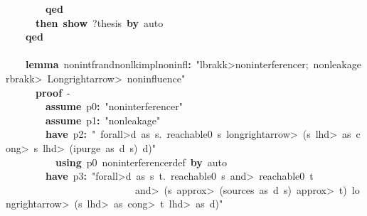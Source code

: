 \documentclass{article}
\newcommand{\syntaxKEYWORDA}[1]{\textcolor[rgb]{0.0,0.4,0.6}{\textbf{#1}}}
\newcommand{\syntaxKEYWORDC}[1]{\textcolor[rgb]{0.0,0.6,1.0}{\textbf{#1}}}
\newcommand{\syntaxLITERALA}[1]{\textcolor[rgb]{1.0,0.0,0.8}{#1}}
\newcommand{\syntaxOPERATOR}[1]{\textcolor[rgb]{0.0,0.0,0.0}{\textbf{#1}}}
\newcommand{\syntaxKEYWORDA}[1]{\textcolor[rgb]{0.0,0.4,0.6}{\textbf{#1}}}
\newcommand{\syntaxKEYWORDC}[1]{\textcolor[rgb]{0.0,0.6,1.0}{\textbf{#1}}}
\newcommand{\syntaxLITERALA}[1]{\textcolor[rgb]{1.0,0.0,0.8}{#1}}
\newcommand{\syntaxOPERATOR}[1]{\textcolor[rgb]{0.0,0.0,0.0}{\textbf{#1}}}
\newcommand{\syntaxKEYWORDA}[1]{\textcolor[rgb]{0.0,0.4,0.6}{\textbf{#1}}}
\newcommand{\syntaxKEYWORDC}[1]{\textcolor[rgb]{0.0,0.6,1.0}{\textbf{#1}}}
\newcommand{\syntaxLITERALA}[1]{\textcolor[rgb]{1.0,0.0,0.8}{#1}}
\newcommand{\syntaxOPERATOR}[1]{\textcolor[rgb]{0.0,0.0,0.0}{\textbf{#1}}}
\newcommand{\syntaxKEYWORDA}[1]{\textcolor[rgb]{0.0,0.4,0.6}{#1}}
\newcommand{\syntaxKEYWORDC}[1]{\textcolor[rgb]{0.0,0.6,1.0}{#1}}
\newcommand{\syntaxLITERALA}[1]{\textcolor[rgb]{1.0,0.0,0.8}{\textbf{#1}}}
\newcommand{\syntaxOPERATOR}[1]{\textcolor[rgb]{0.0,0.0,0.0}{#1}}
\newcommand{\syntaxKEYWORDA}[1]{\textcolor[rgb]{0.0,0.4,0.6}{\textbf{#1}}}
\newcommand{\syntaxKEYWORDC}[1]{\textcolor[rgb]{0.0,0.6,1.0}{\textbf{#1}}}
\newcommand{\syntaxLITERALA}[1]{\textcolor[rgb]{1.0,0.0,0.8}{#1}}
\newcommand{\syntaxOPERATOR}[1]{\textcolor[rgb]{0.0,0.0,0.0}{\textbf{#1}}}
\newcommand{\syntaxKEYWORDA}[1]{\textcolor[rgb]{0.0,0.4,0.6}{\textbf{#1}}}
\newcommand{\syntaxKEYWORDC}[1]{\textcolor[rgb]{0.0,0.6,1.0}{\textbf{#1}}}
\newcommand{\syntaxLITERALA}[1]{\textcolor[rgb]{1.0,0.0,0.8}{#1}}
\newcommand{\syntaxOPERATOR}[1]{\textcolor[rgb]{0.0,0.0,0.0}{\textbf{#1}}}
\begin{document}
{\ }{\ }{\ }{\ }{\ }{\ }{\ }{\ }\syntaxKEYWORDA{qed}\hspace*{\fill}\\
{\ }{\ }{\ }{\ }{\ }{\ }\syntaxKEYWORDA{then}{\ }\syntaxKEYWORDC{show}{\ }?thesis{\ }\syntaxKEYWORDA{by}{\ }auto\hspace*{\fill}\\
{\ }{\ }{\ }{\ }\syntaxKEYWORDA{qed}\hspace*{\fill}\\
\hspace*{\fill}\\
{\ }{\ }{\ }{\ }\syntaxKEYWORDA{lemma}{\ }nonintf\usebox{\underscorebox}r\usebox{\underscorebox}and\usebox{\underscorebox}nonlk\usebox{\underscorebox}impl\usebox{\underscorebox}noninfl\syntaxOPERATOR{:}{\ }\syntaxLITERALA{"\<lbrakk>noninterference\usebox{\underscorebox}r;{\ }nonleakage\<rbrakk>{\ }\<Longrightarrow>{\ }noninfluence"}\hspace*{\fill}\\
{\ }{\ }{\ }{\ }{\ }{\ }\syntaxKEYWORDA{proof}{\ }{-}\hspace*{\fill}\\
{\ }{\ }{\ }{\ }{\ }{\ }{\ }{\ }\syntaxKEYWORDC{assume}{\ }p0\syntaxOPERATOR{:}{\ }\syntaxLITERALA{"noninterference\usebox{\underscorebox}r"}\hspace*{\fill}\\
{\ }{\ }{\ }{\ }{\ }{\ }{\ }{\ }\syntaxKEYWORDC{assume}{\ }p1\syntaxOPERATOR{:}{\ }\syntaxLITERALA{"nonleakage"}\hspace*{\fill}\\
{\ }{\ }{\ }{\ }{\ }{\ }{\ }{\ }\syntaxKEYWORDA{have}{\ }p2\syntaxOPERATOR{:}{\ }\syntaxLITERALA{"{\ }\<forall>d{\ }as{\ }s.{\ }reachable0{\ }s{\ }\<longrightarrow>{\ }(s{\ }\<lhd>{\ }as{\ }\<cong>{\ }s{\ }\<lhd>{\ }(ipurge{\ }as{\ }d{\ }s){\ }\usebox{\atbox}{\ }d)"}\hspace*{\fill}\\
{\ }{\ }{\ }{\ }{\ }{\ }{\ }{\ }{\ }{\ }\syntaxKEYWORDA{using}{\ }p0{\ }noninterference\usebox{\underscorebox}r\usebox{\underscorebox}def{\ }\syntaxKEYWORDA{by}{\ }auto\hspace*{\fill}\\
{\ }{\ }{\ }{\ }{\ }{\ }{\ }{\ }\syntaxKEYWORDA{have}{\ }p3\syntaxOPERATOR{:}{\ }\syntaxLITERALA{"\<forall>d{\ }as{\ }s{\ }t.{\ }reachable0{\ }s{\ }\<and>{\ }reachable0{\ }t}\hspace*{\fill}\\
\syntaxLITERALA{{\ }{\ }{\ }{\ }{\ }{\ }{\ }{\ }{\ }{\ }{\ }{\ }{\ }{\ }{\ }{\ }{\ }{\ }{\ }{\ }{\ }{\ }{\ }{\ }{\ }{\ }\<and>{\ }(s{\ }\<approx>{\ }(sources{\ }as{\ }d{\ }s){\ }\<approx>{\ }t){\ }\<longrightarrow>{\ }(s{\ }\<lhd>{\ }as{\ }\<cong>{\ }t{\ }\<lhd>{\ }as{\ }\usebox{\atbox}{\ }d)"}\hspace*{\fill}\\
\end{document}
